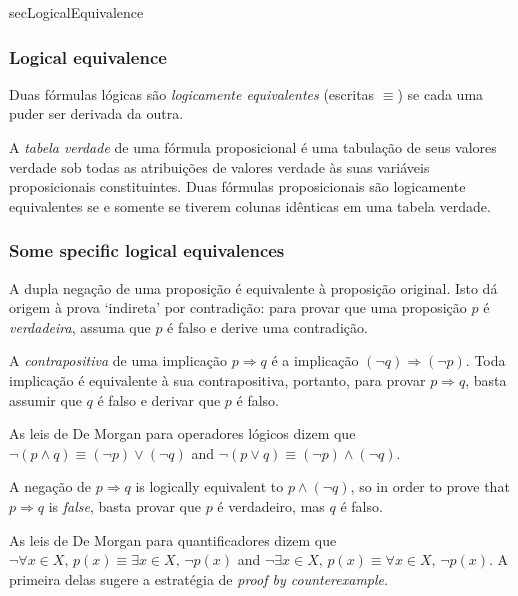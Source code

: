 \begin{tldr}{secLogicalEquivalence}
\subsubsection*{Logical equivalence}

\begin{tldrlist}
Duas fórmulas lógicas são \textit{logicamente equivalentes} (escritas $\equiv$) se cada uma puder ser derivada da outra.

A \textit{tabela verdade} de uma fórmula proposicional é uma tabulação de seus valores verdade sob todas as atribuições de valores verdade às suas variáveis ​​proposicionais constituintes. Duas fórmulas proposicionais são logicamente equivalentes se e somente se tiverem colunas idênticas em uma tabela verdade.
\end{tldrlist}

\subsubsection*{Some specific logical equivalences}

\begin{tldrlist}
A dupla negação de uma proposição é equivalente à proposição original. Isto dá origem à prova `indireta' por contradição: para provar que uma proposição $p$ é \textit{verdadeira}, assuma que $p$ é falso e derive uma contradição.

A \textit{contrapositiva} de uma implicação $p \Rightarrow q$ é a implicação $(\neg q) \Rightarrow (\neg p)$. Toda implicação é equivalente à sua contrapositiva, portanto, para provar $p \Rightarrow q$, basta assumir que $q$ é falso e derivar que $p$ é falso.

As leis de De Morgan para operadores lógicos dizem que $\neg (p \wedge q) \equiv (\neg p) \vee (\neg q)$ and $\neg (p \vee q) \equiv (\neg p) \wedge (\neg q)$.

A negação de $p \Rightarrow q$ is logically equivalent to $p \wedge (\neg q)$, so in order to prove that $p \Rightarrow q$ is \textit{false}, basta provar que $p$ é verdadeiro, mas $q$ é falso.

As leis de De Morgan para quantificadores dizem que $\neg \forall x \in X,\, p(x) \equiv \exists x \in X,\, \neg p(x)$ and $\neg \exists x \in X,\, p(x) \equiv \forall x \in X,\, \neg p(x)$. A primeira delas sugere a estratégia de \textit{proof by counterexample}.
\end{tldrlist}


\end{tldr}
